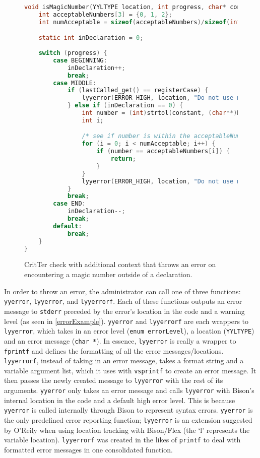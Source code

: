 \documentclass[12pt]{report}
\newcommand{\programName}{CritTer\xspace}
\begin{document}
\begin{figure}
\begin{lstlisting}[language=C]
void isMagicNumber(YYLTYPE location, int progress, char* constant) {
	int acceptableNumbers[3] = {0, 1, 2};
	int numAcceptable = sizeof(acceptableNumbers)/sizeof(int);

	static int inDeclaration = 0;
	
	switch (progress) {
		case BEGINNING:
			inDeclaration++;
			break;
		case MIDDLE:
			if (lastCalled_get() == registerCase) {
				lyyerror(ERROR_HIGH, location, "Do not use magic numbers");
			} else if (inDeclaration == 0) {
				int number = (int)strtol(constant, (char**)NULL, 0);
				int i;

				/* see if number is within the acceptableNumbers array */
				for (i = 0; i < numAcceptable; i++) {
					if (number == acceptableNumbers[i]) {
						return;
					}
				}
				lyyerror(ERROR_HIGH, location, "Do not use magic numbers");
			}
			break;
		case END:
			inDeclaration--;
			break;
		default:
			break;
	}
}
\end{lstlisting}
\caption[\programName Check with Additional Context]{\programName check with additional context that throws an error on encountering a magic number outside of a declaration.}
\label{checkWithContext}
\end{figure}

\newcommand{\yyerror}{\lstinline{yyerror}\xspace}
\newcommand{\lyyerror}{\lstinline{lyyerror}\xspace}
\newcommand{\lyyerrorf}{\lstinline{lyyerrorf}\xspace}

In order to throw an error, the administrator can call one of three functions: \yyerror, \lyyerror, and 
\lyyerrorf. Each of these functions outputs an error message to \lstinline{stderr} preceded by the error's 
location in the code and a warning level (as seen in \autoref{errorExample}). \yyerror and \lyyerrorf 
are each wrappers to \lyyerror, which takes in an error level (\lstinline{enum errorLevel}), a location 
(\lstinline{YYLTYPE}) and an error message (\lstinline{char *}). In essence, \lyyerror is really a wrapper 
to \lstinline{fprintf} and defines the formatting of all the error messages\slash locations. \lyyerrorf, instead 
of taking in an error message, takes a format string and a variable argument list, which it uses with 
\lstinline{vsprintf} to create an error message. It then passes the newly created message to \lyyerror with 
the rest of its arguments. \yyerror only takes an error message and calls \lyyerror with Bison's internal 
location in the code and a default high error level. This is because \yyerror is called internally through 
Bison to represent syntax errors. \yyerror is the only predefined error reporting function; \lyyerror is an 
extension suggested by O'Reily\cite{flex-and-bison} when using location tracking with Bison\slash Flex 
(the `l' represents the variable location). \lyyerrorf was created in the likes of \lstinline{printf} to deal with 
formatted error messages in one consolidated function.
\end{document}
